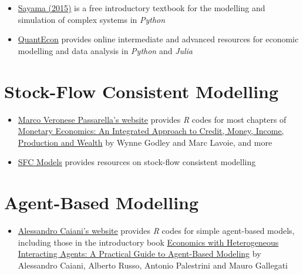 \documentclass[
  letterpaper,
  DIV=11,
  numbers=noendperiod]{scrreprt}
\providecommand{\tightlist}{%
  \setlength{\itemsep}{0pt}\setlength{\parskip}{0pt}}\usepackage{longtable,booktabs,array}
\begin{document}

\begin{itemize}
\tightlist
\item
  \href{https://open.umn.edu/opentextbooks/textbooks/233}{Sayama (2015)}
  is a free introductory textbook for the modelling and simulation of
  complex systems in \emph{Python}
\item
  \href{https://open.umn.edu/opentextbooks/textbooks/233}{QuantEcon}
  provides online intermediate and advanced resources for economic
  modelling and data analysis in \emph{Python} and \emph{Julia}
\end{itemize}

\section*{Stock-Flow Consistent
Modelling}\label{stock-flow-consistent-modelling}


\begin{itemize}
\tightlist
\item
  \href{https://www.marcopassarella.it/en/teaching-2/}{Marco Veronese
  Passarella's website} provides \emph{R} codes for most chapters of
  \href{https://link.springer.com/book/10.1057/9780230626546}{Monetary
  Economics: An Integrated Approach to Credit, Money, Income, Production
  and Wealth} by Wynne Godley and Marc Lavoie, and more
\item
  \href{https://sfc-models.net/}{SFC Models} provides resources on
  stock-flow consistent modelling
\end{itemize}

\section*{Agent-Based Modelling}\label{agent-based-modelling}


\begin{itemize}
\tightlist
\item
  \href{https://sites.google.com/view/alessandro-caiani/teaching?authuser=0}{Alessandro
  Caiani's website} provides \emph{R} codes for simple agent-based
  models, including those in the introductory book
  \href{https://link.springer.com/book/10.1007/978-3-319-44058-3}{Economics
  with Heterogeneous Interacting Agents: A Practical Guide to
  Agent-Based Modeling} by Alessandro Caiani, Alberto Russo, Antonio
  Palestrini and Mauro Gallegati
\end{itemize}
\end{document}
